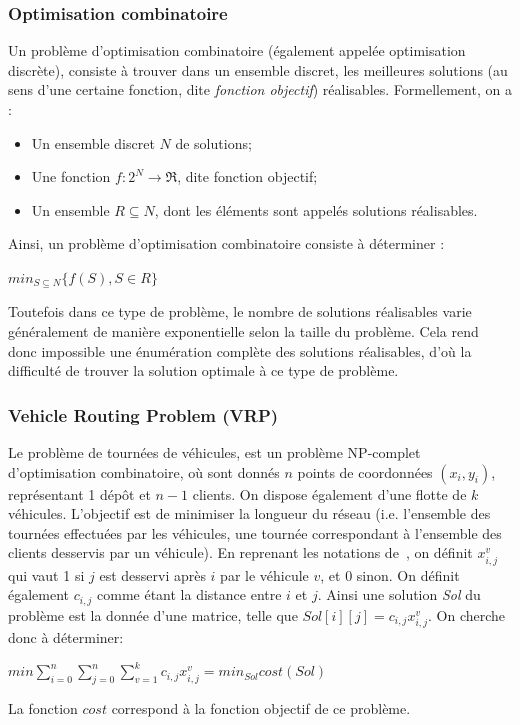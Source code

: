 \documentclass[a4paper,11pt]{article}%
\begin{document}
\subsubsection{Optimisation combinatoire}
Un problème d'optimisation combinatoire (également appelée optimisation discrète), consiste à trouver dans un ensemble discret, les meilleures solutions (au sens d'une certaine fonction, dite \emph{fonction objectif}) réalisables. 
Formellement, on a :

\begin{itemize}
\item Un ensemble discret $N$ de solutions;
\item Une fonction $f : 2^N \rightarrow \Re$, dite fonction objectif;
\item Un ensemble $R \subseteq N$, dont les éléments sont appelés solutions réalisables.
\end{itemize}

Ainsi, un problème d'optimisation combinatoire consiste à déterminer :

\begin{center}
$ min_{S \subseteq N} \{ f(S), S \in R \} $
\end{center}

Toutefois dans ce type de problème, le nombre de solutions réalisables varie généralement de manière exponentielle selon la taille du problème. Cela rend donc impossible une énumération complète des solutions réalisables, d'où la difficulté de trouver la solution optimale à ce type de problème.

\subsubsection{Vehicle Routing Problem (VRP)}

Le problème de tournées de véhicules, est un problème NP-complet d'optimisation combinatoire, où sont donnés $n$ points de coordonnées $(x_i,y_i)$, représentant 1 dépôt et $n-1$ clients. On dispose également d'une flotte de $k$ véhicules. 
L'objectif est de minimiser la longueur du réseau (i.e. l'ensemble des tournées effectuées par les véhicules, une tournée correspondant à l'ensemble des clients desservis par un véhicule). 
En reprenant les notations de~\cite{cvrp_pres}, on définit $x_{i,j}^v$ qui vaut 1 si $j$ est desservi après $i$ par le véhicule $v$, et 0 sinon. 
On définit également $c_{i,j}$ comme étant la distance entre $i$ et $j$.
Ainsi une solution \emph{Sol} du problème est la donnée d'une matrice, telle que $Sol[i][j] = c_{i,j} x_{i,j}^v$.
On cherche donc à déterminer:
\begin{center}
$ min \sum_{i = 0}^{n} \sum_{j = 0}^{n} \sum_{v = 1}^{k} c_{i,j} x_{i,j}^v = min_{Sol}cost(Sol)$
\end{center}
La fonction $cost$ correspond à la fonction objectif de ce problème.
\end{document}
